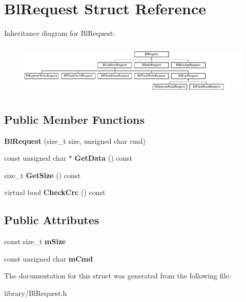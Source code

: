 \hypertarget{struct_bl_request}{\section{Bl\-Request Struct Reference}
\label{struct_bl_request}
}
Inheritance diagram for Bl\-Request\-:\begin{figure}[H]
\begin{center}
\leavevmode
\includegraphics[height=2.539683cm]{struct_bl_request}
\end{center}
\end{figure}
\subsection*{Public Member Functions}
\begin{DoxyCompactItemize}
\item 
\hypertarget{struct_bl_request_a3b8671171980b783d25f8491e55e1a58}{{\bfseries Bl\-Request} (size\-\_\-t size, unsigned char cmd)}\label{struct_bl_request_a3b8671171980b783d25f8491e55e1a58}

\item 
\hypertarget{struct_bl_request_aa96361ac208e80204a36870f79f90a83}{const unsigned char $\ast$ {\bfseries Get\-Data} () const }\label{struct_bl_request_aa96361ac208e80204a36870f79f90a83}

\item 
\hypertarget{struct_bl_request_aaf1d5f14893458a504180196837dcca3}{size\-\_\-t {\bfseries Get\-Size} () const }\label{struct_bl_request_aaf1d5f14893458a504180196837dcca3}

\item 
\hypertarget{struct_bl_request_a15810e2347a8b2170030f0c2f98fe4d8}{virtual bool {\bfseries Check\-Crc} () const }\label{struct_bl_request_a15810e2347a8b2170030f0c2f98fe4d8}

\end{DoxyCompactItemize}
\subsection*{Public Attributes}
\begin{DoxyCompactItemize}
\item 
\hypertarget{struct_bl_request_afd0174f556d9d4538de850260e8d08a4}{const size\-\_\-t {\bfseries m\-Size}}\label{struct_bl_request_afd0174f556d9d4538de850260e8d08a4}

\item 
\hypertarget{struct_bl_request_a96c808cdbb7f02eeffcea7ebcdb98d0b}{const unsigned char {\bfseries m\-Cmd}}\label{struct_bl_request_a96c808cdbb7f02eeffcea7ebcdb98d0b}

\end{DoxyCompactItemize}


The documentation for this struct was generated from the following file\-:\begin{DoxyCompactItemize}
\item 
library/Bl\-Request.\-h\end{DoxyCompactItemize}
